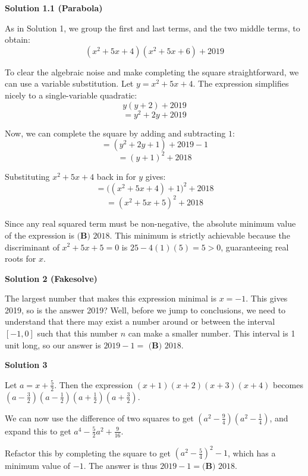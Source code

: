 \begin{enumerate}
 



\textbf{Solution 1.1 (Parabola)}

As in Solution 1, we group the first and last terms, and the two middle terms, to obtain:
 \[(x^2+5x+4)(x^2+5x+6)+2019\]

 To clear the algebraic noise and make completing the square straightforward, we can use a variable substitution. Let $y = x^2 + 5x + 4$. The expression simplifies nicely to a single-variable quadratic:
 \[y(y + 2) + 2019\]
 \[= y^2 + 2y + 2019\]

 Now, we can complete the square by adding and subtracting $1$:
 \[= (y^2 + 2y + 1) + 2019 - 1\]
 \[= (y + 1)^2 + 2018\]

 Substituting $x^2 + 5x + 4$ back in for $y$ gives:
 \[= \big((x^2 + 5x + 4) + 1\big)^2 + 2018\]
 \[= (x^2 + 5x + 5)^2 + 2018\]

 Since any real squared term must be non-negative, the absolute minimum value of the expression is $\boxed{\textbf{(B) } 2018}$. This minimum is strictly achievable because the discriminant of $x^2 + 5x + 5 = 0$ is $25 - 4(1)(5) = 5 > 0$, guaranteeing real roots for $x$.

 



\textbf{Solution 2 (Fakesolve)}

The largest number that makes this expression minimal is \( x = -1 \). This gives 2019, so is the answer 2019? Well, before we jump to conclusions, we need to understand that there may exist a number around or between the interval \( [-1, 0] \) such that this number \( n \) can make a smaller number. This interval is 1 unit long, so our answer is \( 2019 - 1 = \) $\boxed{\textbf{(B) } 2018}$.

 



\textbf{Solution 3}

Let $a=x+\frac{5}{2}$. Then the expression $(x+1)(x+2)(x+3)(x+4)$ becomes $\left(a-\frac{3}{2}\right)\left(a-\frac{1}{2}\right)\left(a+\frac{1}{2}\right)\left(a+\frac{3}{2}\right)$. 

 We can now use the difference of two squares to get $\left(a^2-\frac{9}{4}\right)\left(a^2-\frac{1}{4}\right)$, and expand this to get $a^4-\frac{5}{2}a^2+\frac{9}{16}$.

 Refactor this by completing the square to get $\left(a^2-\frac{5}{4}\right)^2-1$, which has a minimum value of $-1$. The answer is thus $2019-1=\boxed{\textbf{(B) }2018}$.


\end{enumerate}

